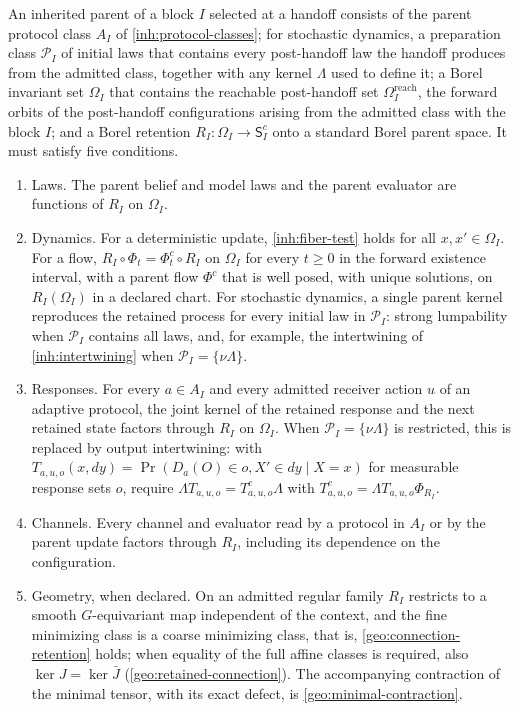 An inherited parent of a block $I$ selected at a handoff consists of the
parent protocol class $A_I$ of \cref{inh:protocol-classes}; for stochastic
dynamics, a preparation class $\mathcal P_I$ of initial laws that contains
every post-handoff law the handoff produces from the admitted class, together
with any kernel $\Lambda$ used to define it; a Borel invariant set $\Omega_I$
that contains the reachable post-handoff set $\Omega_I^{\mathrm{reach}}$, the
forward orbits of the post-handoff configurations arising from the admitted
class with the block $I$; and a Borel retention $R_I:\Omega_I\to\mathsf S^c_I$
onto a standard Borel parent space. It must satisfy five conditions.
\begin{enumerate}
\item[(L)] Laws. The parent belief and model laws and the parent evaluator
are functions of $R_I$ on $\Omega_I$.
\item[(D)] Dynamics. For a deterministic update, \cref{inh:fiber-test}
holds for all $x,x'\in\Omega_I$. For a flow, $R_I\circ\Phi_t=\Phi^c_t\circ R_I$
on $\Omega_I$ for every $t\geq0$ in the forward existence interval, with a
parent flow $\Phi^c$ that is well posed, with unique solutions, on
$R_I(\Omega_I)$ in a declared chart. For stochastic dynamics, a single
parent kernel reproduces the retained process for every initial law in
$\mathcal P_I$: strong lumpability when $\mathcal P_I$ contains all laws,
and, for example, the intertwining of \cref{inh:intertwining} when
$\mathcal P_I=\{\nu\Lambda\}$.
\item[(B)] Responses. For every $a\in A_I$ and every admitted receiver action
$u$ of an adaptive protocol, the joint kernel of the retained response and
the next retained state factors through $R_I$ on $\Omega_I$. When
$\mathcal P_I=\{\nu\Lambda\}$ is restricted, this is replaced by output
intertwining: with $T_{a,u,o}(x,dy)=\Pr(D_a(O)\in o,X'\in dy\mid X=x)$ for
measurable response sets $o$, require $\Lambda T_{a,u,o}=T^c_{a,u,o}\Lambda$
with $T^c_{a,u,o}=\Lambda T_{a,u,o}\Phi_{R_I}$.
\item[(C)] Channels. Every channel and evaluator read by a protocol in $A_I$
or by the parent update factors through $R_I$, including its dependence on
the configuration.
\item[(G)] Geometry, when declared. On an admitted regular family $R_I$
restricts to a smooth $G$-equivariant map independent of the context, and
the fine minimizing class is a coarse minimizing class, that is,
\cref{geo:connection-retention} holds; when equality of the full affine
classes is required, also $\ker J=\ker\bar J$
(\cref{geo:retained-connection}). The accompanying contraction of the
minimal tensor, with its exact defect, is \cref{geo:minimal-contraction}.
\end{enumerate}
